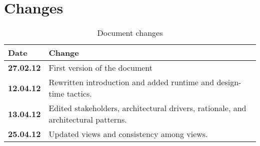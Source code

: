 \pagebreak

\section{Changes}

\begin{table}[h!]
\begin{tabular}{ | p{90pt} | p{270pt}  |}
\hline
\bf Date & \bf Change \\ \hline
\bf 27.02.12  &  First version of the document  \\ \hline
\bf 12.04.12  &  Rewritten introduction and added runtime and design-time tactics.  \\ \hline
\bf 13.04.12  &  Edited stakeholders, architectural drivers, rationale, and architectural patterns.  \\ \hline
\bf 25.04.12  &  Updated views and consistency among views.  \\ \hline
\end{tabular}
\caption{Document changes}
\end{table}




